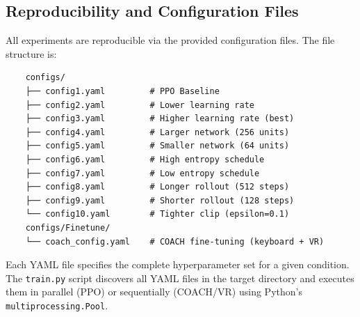 \documentclass[../report.tex]{subfiles}
\begin{document}
    \subsection{Reproducibility and Configuration Files}

    All experiments are reproducible via the provided configuration files. The file structure is:

    \begin{verbatim}
    configs/
    ├── config1.yaml         # PPO Baseline
    ├── config2.yaml         # Lower learning rate
    ├── config3.yaml         # Higher learning rate (best)
    ├── config4.yaml         # Larger network (256 units)
    ├── config5.yaml         # Smaller network (64 units)
    ├── config6.yaml         # High entropy schedule
    ├── config7.yaml         # Low entropy schedule
    ├── config8.yaml         # Longer rollout (512 steps)
    ├── config9.yaml         # Shorter rollout (128 steps)
    └── config10.yaml        # Tighter clip (epsilon=0.1)
    configs/Finetune/
    └── coach_config.yaml    # COACH fine-tuning (keyboard + VR)
    \end{verbatim}

    Each YAML file specifies the complete hyperparameter set for a given condition. The \texttt{train.py} script discovers all YAML files in the target directory and executes them in parallel (PPO) or sequentially (COACH/VR) using Python's \texttt{multiprocessing.Pool}.
\end{document}
